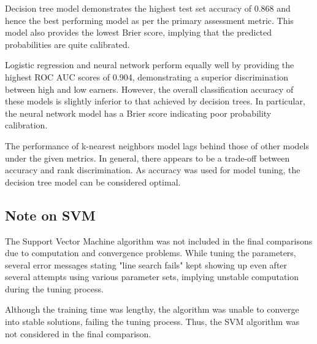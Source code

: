 \documentclass{article}
\begin{document}
Decision tree model demonstrates the highest test set accuracy of 0.868 and hence the best performing model as per the primary assessment metric. This model also provides the lowest Brier score, implying that the predicted probabilities are quite calibrated.

\medskip
Logistic regression and neural network perform equally well by providing the highest ROC AUC scores of 0.904, demonstrating a superior discrimination between high and low earners. However, the overall classification accuracy of these models is slightly inferior to that achieved by decision trees. In particular, the neural network model has a Brier score indicating poor probability calibration.

\medskip
The performance of k-nearest neighbors model lags behind those of other models under the given metrics. In general, there appears to be a trade-off between accuracy and rank discrimination. As accuracy was used for model tuning, the decision tree model can be considered optimal.

\subsection*{Note on SVM}

The Support Vector Machine algorithm was not included in the final comparisons due to computation and convergence problems. While tuning the parameters, several error messages stating "line search fails" kept showing up even after several attempts using various parameter sets, implying unstable computation during the tuning process.

\medskip
Although the training time was lengthy, the algorithm was unable to converge into stable solutions, failing the tuning process. Thus, the SVM algorithm was not considered in the final comparison.
\end{document}
